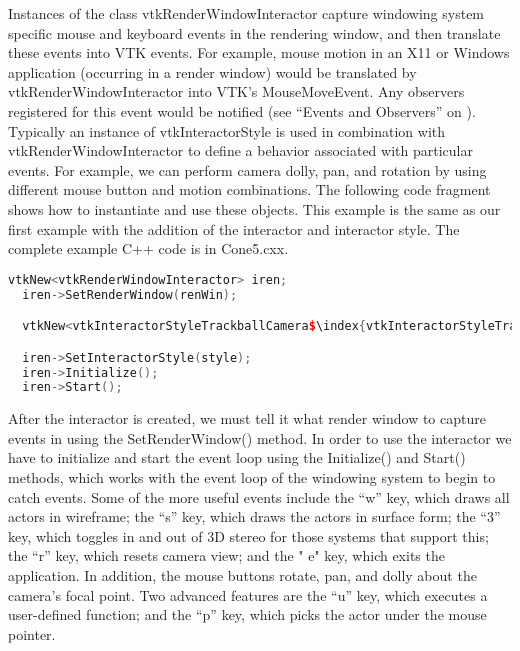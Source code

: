\begin{description}[leftmargin=0cm,labelindent=0cm]
Instances of the class vtkRenderWindowInteractor capture windowing system specific mouse and keyboard events in the rendering window, and then translate these events into VTK events. For example, mouse motion in an X11 or Windows application (occurring in a render window) would be translated by vtkRenderWindowInteractor into VTK's MouseMoveEvent. Any observers registered for this event would be notified (see ``Events and Observers'' on \pageref{sub:examples_events_observers} ). Typically an instance of vtkInteractorStyle is used in combination with vtkRenderWindowInteractor to define a behavior associated with particular events. For example, we can perform camera dolly, pan, and rotation by using different mouse button and motion combinations. The following code fragment shows how to instantiate and use these objects. This example is the same as our first example with the addition of the interactor and interactor style. The complete example C++ code is in Cone5.cxx.

\begin{lstlisting}[language=C++, caption={Cone5.cxx}, escapechar=\$]
  vtkNew<vtkRenderWindowInteractor> iren;
  iren->SetRenderWindow(renWin);

  vtkNew<vtkInteractorStyleTrackballCamera$\index{vtkInteractorStyleTrackballCamera!example}$ style;

  iren->SetInteractorStyle(style);
  iren->Initialize();
  iren->Start();
\end{lstlisting}

After the interactor is created, we must tell it what render window to capture events in using the SetRenderWindow() method. In order to use the interactor we have to initialize and start the event loop using the Initialize() and Start() methods, which works with the event loop of the windowing system to begin to catch events. Some of the more useful events include the ``w'' key, which draws all actors in wireframe; the ``s'' key, which draws the actors in surface form; the ``3'' key, which toggles in and out of 3D stereo for those systems that support this; the ``r'' key, which resets camera view; and the " e" key, which exits the application. In addition, the mouse buttons rotate, pan, and dolly about the camera's focal point. Two advanced features are the ``u'' key, which executes a user-defined function; and the ``p'' key, which picks the actor under the mouse pointer.

\item[Interpreted Code.]
\label{subsec:examples_interpreted_code}


\end{description}
